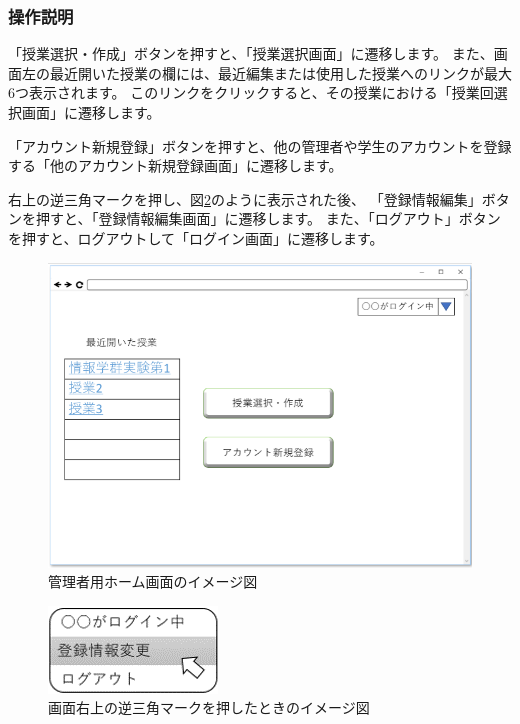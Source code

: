 \subsubsection{操作説明}
「授業選択・作成」ボタンを押すと、「授業選択画面」に遷移します。
また、画面左の最近開いた授業の欄には、最近編集または使用した授業へのリンクが最大6つ表示されます。
このリンクをクリックすると、その授業における「授業回選択画面」に遷移します。

「アカウント新規登録」ボタンを押すと、他の管理者や学生のアカウントを登録する「他のアカウント新規登録画面」に遷移します。

右上の逆三角マークを押し、図\ref{fig:05}のように表示された後、
「登録情報編集」ボタンを押すと、「登録情報編集画面」に遷移します。
また、「ログアウト」ボタンを押すと、ログアウトして「ログイン画面」に遷移します。



\begin{figure}[phtbp]
  \begin{center}
    \includegraphics[width=0.7\linewidth,clip]{./img/04.png}
    \caption{管理者用ホーム画面のイメージ図}\label{fig:04}
  \end{center}
\end{figure}

\begin{figure}[phtbp]
  \begin{center}
    \includegraphics[width=0.3\linewidth,clip]{./img/05_.png}
    \caption{画面右上の逆三角マークを押したときのイメージ図}\label{fig:05}
  \end{center}
\end{figure}

